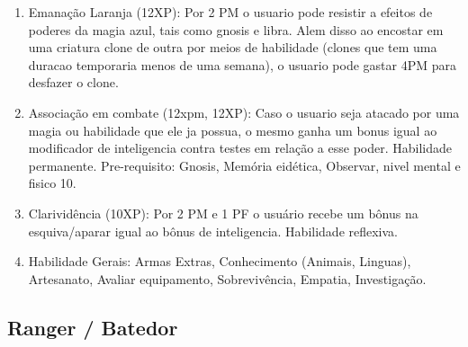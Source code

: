\begin{enumerate}
	\item Emanação Laranja (12XP): Por 2 PM o usuario pode resistir a efeitos de poderes da magia azul, tais como gnosis e libra. Alem disso ao encostar em uma criatura clone de outra por meios de habilidade (clones que tem uma duracao temporaria menos de uma semana), o usuario pode gastar 4PM para desfazer o clone.

    \item Associação em combate (12xpm, 12XP): Caso o usuario seja atacado por uma magia ou habilidade que ele ja possua, o mesmo ganha um bonus igual ao modificador de inteligencia contra testes em relação a esse poder. Habilidade permanente. Pre-requisito: Gnosis, Memória eidética, Observar, nivel mental e fisico 10.


	\item Clarividência (10XP): Por 2 PM e 1 PF o usuário recebe um bônus na esquiva/aparar igual ao bônus de inteligencia. Habilidade reflexiva.

	\item Habilidade Gerais: Armas Extras, Conhecimento (Animais, Linguas), Artesanato, Avaliar equipamento, Sobrevivência, Empatia, Investigação. 
	
\end{enumerate}


\subsection{Ranger / Batedor} 

